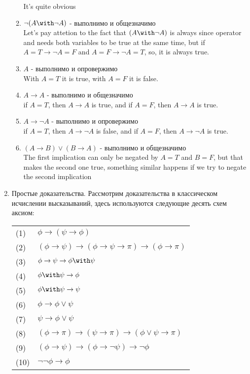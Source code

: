 \documentclass{article}
\begin{document}
\begin{enumerate}
\begin{enumerate}
        It's quite obvious
        \item $\neg (A \with \neg A)$ - выполнимо и общезначимо \\
        Let's pay attetion to the fact that $(A \with \neg A)$ is always since operator and needs both variables to be true at the same time, but if $A = T \rightarrow \neg A = F$ and $A = F \rightarrow \neg A = T$, so, it is always true.
        \item $A$ - выполнимо и опровержимо \\
        With $A = T$ it is true, with $A = F$ it is false.
        \item $A \rightarrow A$ - выполнимо и общезначимо \\
        if $A = T$, then $A \rightarrow A$ is true, and if $A = F$, then $A \rightarrow A$ is true.
        \item $A \rightarrow \neg A$ - выполнимо и опровержимо \\
        if $A = T$, then $A \rightarrow \neg A$ is false, and if $A = F$, then $A \rightarrow \neg A$ is true.
        \item $(A \rightarrow B) \vee (B \rightarrow A)$ - выполнимо и общезначимо \\
        The first implication can only be negated by $A = T$ and $B = F$, but that makes the second one true, something similar happens if we try to negate the second implication

\end{enumerate}
    
    \item Простые доказательства. Рассмотрим доказательства в классическом исчислении
    высказываний, здесь используются следующие десять схем аксиом:
    
    \begin{tabular}{ll}
    (1) & $\phi \rightarrow (\psi \rightarrow \phi)$ \\
    (2) & $(\phi \rightarrow \psi) \rightarrow (\phi \rightarrow \psi \rightarrow \pi) \rightarrow (\phi \rightarrow \pi)$ \\
    (3) & $\phi \rightarrow \psi \rightarrow \phi \with \psi$\\
    (4) & $\phi \with \psi \rightarrow \phi$\\
    (5) & $\phi \with \psi \rightarrow \psi$\\
    (6) & $\phi \rightarrow \phi \vee \psi$\\
    (7) & $\psi \rightarrow \phi \vee \psi$\\
    (8) & $(\phi \rightarrow \pi) \rightarrow (\psi \rightarrow \pi) \rightarrow (\phi \vee \psi \rightarrow \pi)$\\
    (9) & $(\phi \rightarrow \psi) \rightarrow (\phi \rightarrow \neg \psi) \rightarrow \neg \phi$\\
    (10) & $\neg \neg \phi \rightarrow \phi$
    \end{tabular}
    

\end{enumerate}
\end{document}

